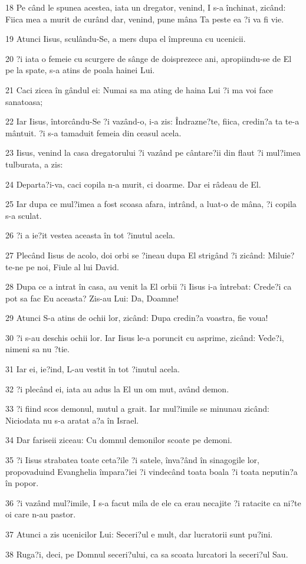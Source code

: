 \par 18 Pe când le spunea acestea, iata un dregator, venind, I s-a închinat, zicând: Fiica mea a murit de curând dar, venind, pune mâna Ta peste ea ?i va fi vie.
\par 19 Atunci Iisus, sculându-Se, a mers dupa el împreuna cu ucenicii.
\par 20 ?i iata o femeie cu scurgere de sânge de doisprezece ani, apropiindu-se de El pe la spate, s-a atins de poala hainei Lui.
\par 21 Caci zicea în gândul ei: Numai sa ma ating de haina Lui ?i ma voi face sanatoasa;
\par 22 Iar Iisus, întorcându-Se ?i vazând-o, i-a zis: Îndrazne?te, fiica, credin?a ta te-a mântuit. ?i s-a tamaduit femeia din ceasul acela.
\par 23 Iisus, venind la casa dregatorului ?i vazând pe cântare?ii din flaut ?i mul?imea tulburata, a zis:
\par 24 Departa?i-va, caci copila n-a murit, ci doarme. Dar ei râdeau de El.
\par 25 Iar dupa ce mul?imea a fost scoasa afara, intrând, a luat-o de mâna, ?i copila s-a sculat.
\par 26 ?i a ie?it vestea aceasta în tot ?inutul acela.
\par 27 Plecând Iisus de acolo, doi orbi se ?ineau dupa El strigând ?i zicând: Miluie?te-ne pe noi, Fiule al lui David.
\par 28 Dupa ce a intrat în casa, au venit la El orbii ?i Iisus i-a întrebat: Crede?i ca pot sa fac Eu aceasta? Zis-au Lui: Da, Doamne!
\par 29 Atunci S-a atins de ochii lor, zicând: Dupa credin?a voastra, fie voua!
\par 30 ?i s-au deschis ochii lor. Iar Iisus le-a poruncit cu asprime, zicând: Vede?i, nimeni sa nu ?tie.
\par 31 Iar ei, ie?ind, L-au vestit în tot ?inutul acela.
\par 32 ?i plecând ei, iata au adus la El un om mut, având demon.
\par 33 ?i fiind scos demonul, mutul a grait. Iar mul?imile se minunau zicând: Niciodata nu s-a aratat a?a în Israel.
\par 34 Dar fariseii ziceau: Cu domnul demonilor scoate pe demoni.
\par 35 ?i Iisus strabatea toate ceta?ile ?i satele, înva?ând în sinagogile lor, propovaduind Evanghelia împara?iei ?i vindecând toata boala ?i toata neputin?a în popor.
\par 36 ?i vazând mul?imile, I s-a facut mila de ele ca erau necajite ?i ratacite ca ni?te oi care n-au pastor.
\par 37 Atunci a zis ucenicilor Lui: Seceri?ul e mult, dar lucratorii sunt pu?ini.
\par 38 Ruga?i, deci, pe Domnul seceri?ului, ca sa scoata lurcatori la seceri?ul Sau.

